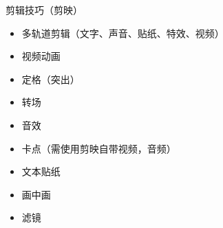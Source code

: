 \documentclass{book}
\begin{document}
剪辑技巧（剪映）\begin{itemize}
          \item 多轨道剪辑（文字、声音、贴纸、特效、视频）
          \item 视频动画
          \item 定格（突出）
          \item 转场
          \item 音效
          \item 卡点（需使用剪映自带视频，音频）
          \item 文本贴纸
          \item 画中画
          \item 滤镜
        \end{itemize}
\end{document}
